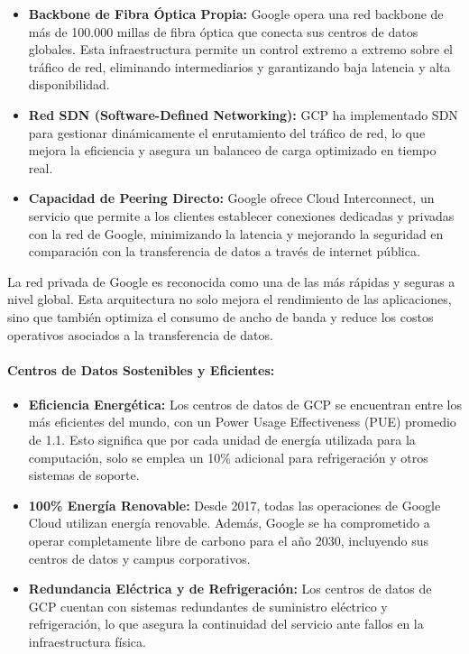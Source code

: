 {                \begin{itemize}
                    \item \textbf{Backbone de Fibra Óptica Propia:} Google opera una red backbone de más de 100.000 millas de fibra óptica que conecta sus centros de datos globales. Esta infraestructura permite un control extremo a extremo sobre el tráfico de red, eliminando intermediarios y garantizando baja latencia y alta disponibilidad.
                    \item \textbf{Red SDN (Software-Defined Networking):} GCP ha implementado SDN para gestionar dinámicamente el enrutamiento del tráfico de red, lo que mejora la eficiencia y asegura un balanceo de carga optimizado en tiempo real.
                    \item \textbf{Capacidad de Peering Directo:} Google ofrece Cloud Interconnect, un servicio que permite a los clientes establecer conexiones dedicadas y privadas con la red de Google, minimizando la latencia y mejorando la seguridad en comparación con la transferencia de datos a través de internet pública.
                \end{itemize}
                
                La red privada de Google es reconocida como una de las más rápidas y seguras a nivel global. Esta arquitectura no solo mejora el rendimiento de las aplicaciones, sino que también optimiza el consumo de ancho de banda y reduce los costos operativos asociados a la transferencia de datos.
                
                \paragraph{Centros de Datos Sostenibles y Eficientes:}
                
                \begin{itemize}
                    \item \textbf{Eficiencia Energética:} Los centros de datos de GCP se encuentran entre los más eficientes del mundo, con un Power Usage Effectiveness (PUE) promedio de 1.1. Esto significa que por cada unidad de energía utilizada para la computación, solo se emplea un 10\% adicional para refrigeración y otros sistemas de soporte.
                    \item \textbf{100\% Energía Renovable:} Desde 2017, todas las operaciones de Google Cloud utilizan energía renovable. Además, Google se ha comprometido a operar completamente libre de carbono para el año 2030, incluyendo sus centros de datos y campus corporativos.
                    \item \textbf{Redundancia Eléctrica y de Refrigeración:} Los centros de datos de GCP cuentan con sistemas redundantes de suministro eléctrico y refrigeración, lo que asegura la continuidad del servicio ante fallos en la infraestructura física.
                \end{itemize}
                
}

